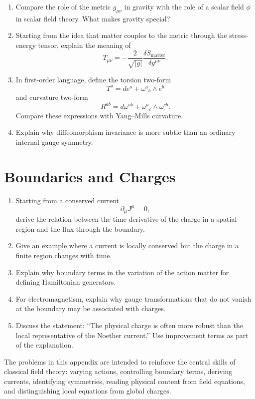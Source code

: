 \begin{enumerate}
    \item Compare the role of the metric \(g_{\mu\nu}\) in gravity with the role of
    a scalar field \(\phi\) in scalar field theory. What makes gravity special?

    \item Starting from the idea that matter couples to the metric through the
    stress-energy tensor, explain the meaning of
    \[
        T_{\mu\nu}=-\frac{2}{\sqrt{|g|}}\frac{\delta S_{\mathrm{matter}}}{\delta g^{\mu\nu}}.
    \]

    \item In first-order language, define the torsion two-form
    \[
        T^a=de^a+\omega^a{}_b\wedge e^b
    \]
    and curvature two-form
    \[
        R^{ab}=d\omega^{ab}+\omega^a{}_c\wedge\omega^{cb}.
    \]
    Compare these expressions with Yang--Mills curvature.

    \item Explain why diffeomorphism invariance is more subtle than an ordinary
    internal gauge symmetry.
\end{enumerate}

\section{Boundaries and Charges}

\begin{enumerate}
    \item Starting from a conserved current
    \[
        \partial_\mu J^\mu=0,
    \]
    derive the relation between the time derivative of the charge in a spatial
    region and the flux through the boundary.

    \item Give an example where a current is locally conserved but the charge in a
    finite region changes with time.

    \item Explain why boundary terms in the variation of the action matter for
    defining Hamiltonian generators.

    \item For electromagnetism, explain why gauge transformations that do not
    vanish at the boundary may be associated with charges.

    \item Discuss the statement: ``The physical charge is often more robust than
    the local representative of the Noether current.'' Use improvement terms as
    part of the explanation.
\end{enumerate}

\begin{summarybox}
The problems in this appendix are intended to reinforce the central skills of
classical field theory: varying actions, controlling boundary terms, deriving
currents, identifying symmetries, reading physical content from field equations,
and distinguishing local equations from global charges.
\end{summarybox}

